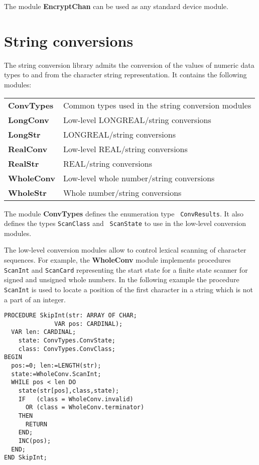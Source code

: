 The module {\bf EncryptChan} can be used as any standard
device module.

\section{String conversions}\label{lib:ISO:conv}

The string conversion library admits the conversion of the values
of numeric data types to and from the character string
representation. It contains the following modules:
\begin{flushleft}
\begin{tabular}{ll}
\bf ConvTypes &    Common types used in the string conversion modules\\
\bf LongConv &     Low-level LONGREAL/string conversions         \\
\bf LongStr &      LONGREAL/string conversions                   \\
\bf RealConv &     Low-level REAL/string conversions         \\
\bf RealStr &      REAL/string conversions                   \\
\bf WholeConv &    Low-level whole number/string conversions         \\
\bf WholeStr &     Whole number/string conversions                   \\
\end{tabular}
\end{flushleft}

\noindent
The module {\bf ConvTypes} defines the enumeration type {\tt
ConvResults}. It also defines the types {\tt ScanClass} and {\tt
ScanState} to use in the low-level conversion modules.

The low-level conversion modules allow to control lexical
scanning of character sequences. For example, the {\bf WholeConv}
module implements procedures {\tt ScanInt} and {\tt ScanCard}
representing the start state for a finite state scanner for
signed and unsigned whole numbers. In the following example the procedure
{\tt ScanInt} is used to locate a
position of the first character in a string which is not
a part of an integer.
\begin{verbatim}
PROCEDURE SkipInt(str: ARRAY OF CHAR;
              VAR pos: CARDINAL);
  VAR len: CARDINAL;
    state: ConvTypes.ConvState;
    class: ConvTypes.ConvClass;
BEGIN
  pos:=0; len:=LENGTH(str);
  state:=WholeConv.ScanInt;
  WHILE pos < len DO
    state(str[pos],class,state);
    IF   (class = WholeConv.invalid)
      OR (class = WholeConv.terminator)
    THEN
      RETURN
    END;
    INC(pos);
  END;
END SkipInt;
\end{verbatim}


